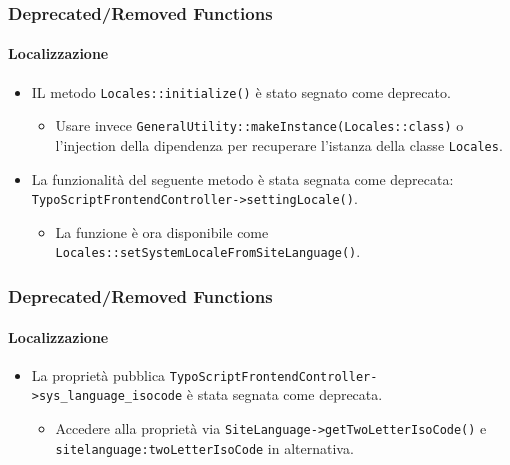 \begin{frame}[fragile]
	\frametitle{Deprecated/Removed Functions}
	\framesubtitle{Localizzazione}

	\begin{itemize}
		\item IL metodo \texttt{Locales::initialize()} è stato segnato come deprecato.

			\begin{itemize}\smaller
				\item[\ding{228}] Usare invece \texttt{GeneralUtility::makeInstance(Locales::class)} o
				l'injection della dipendenza per recuperare l'istanza della classe \texttt{Locales}.
			\end{itemize}\normalsize

		\item La funzionalità del seguente metodo è stata segnata come deprecata:\newline
			\texttt{TypoScriptFrontendController->settingLocale()}.

			\begin{itemize}\smaller
				\item[\ding{228}] La funzione è ora disponibile come
				{\fontsize{8}{8} \selectfont \texttt{Locales::setSystemLocaleFromSiteLanguage()}.}
			\end{itemize}\normalsize

	\end{itemize}

\end{frame}


\begin{frame}[fragile]
	\frametitle{Deprecated/Removed Functions}
	\framesubtitle{Localizzazione}

	\begin{itemize}
		\item La proprietà pubblica \texttt{TypoScriptFrontendController->sys\_language\_isocode}
			è stata segnata come deprecata.

			\begin{itemize}\smaller
				\item[\ding{228}] Accedere alla proprietà via \texttt{SiteLanguage->getTwoLetterIsoCode()}
				e \texttt{sitelanguage:twoLetterIsoCode} in alternativa.
			\end{itemize}\normalsize

	\end{itemize}

\end{frame}

